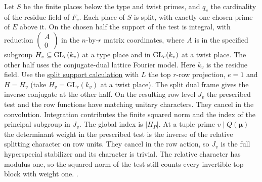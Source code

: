 Let \(S\) be the finite places below the type and twist primes,
and \(q_v\) the cardinality of the residue field of \(F_v\).
Each place of \(S\) is split, with exactly one chosen prime
of \(E\) above it. On the chosen half the support of the test
is integral, with reduction
\(\left(\begin{smallmatrix}A\\0\end{smallmatrix}\right)\)
in the \(n\)-by-\(r\) matrix coordinates, where \(A\) is in
the specified subgroup \(H_v\subseteq{\rm GL}_r(k_v)\) at a
type place and in \({\rm GL}_r(k_v)\) at a twist place. The
other half uses the conjugate-dual lattice Fourier model.
Here \(k_v\) is the residue field. Use the
\hyperlink{proof.split-primitive-support}{split support calculation}
with \(L\) the top \(r\)-row projection, \(e=1\) and \(H=H_v\)
(take \(H_v=\mathrm{GL}_r(k_v)\) at a twist place).
The split dual frame gives the inverse conjugate at the other half.
On the resulting row level \(J_v\) the prescribed test and the row
functions have matching unitary characters. They cancel in the
convolution. Integration contributes the finite squared norm and
the index of the principal subgroup in \(J_v\). The
global index is \(|H_P|\). At a tuple prime \(v\mid Q(\boldsymbol\mu)\)
the determinant weight in the prescribed test is the inverse
of the relative splitting character on row units. They cancel
in the row action, so \(J_v\) is the full hyperspecial
stabilizer and its character is trivial. The relative
character has modulus one, so the squared norm of the test
still counts every invertible top block with weight one.
.

